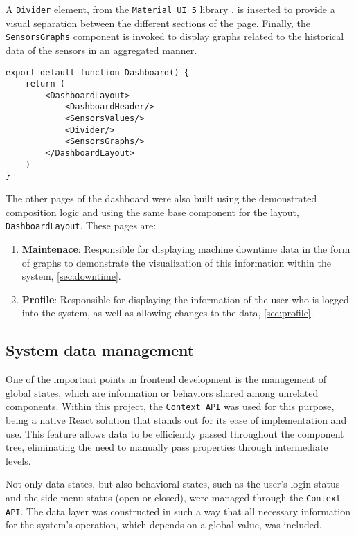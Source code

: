 A \texttt{Divider} element, from the \texttt{Material UI 5} library \cite{muiDocs}, is inserted to provide a visual separation between the different sections of the page. Finally, the \texttt{SensorsGraphs} component is invoked to display graphs related to the historical data of the sensors in an aggregated manner.

\begin{verbatim}
export default function Dashboard() {
    return (
        <DashboardLayout>
            <DashboardHeader/>
            <SensorsValues/>
            <Divider/>
            <SensorsGraphs/>
        </DashboardLayout>
    )
}
\end{verbatim}

The other pages of the dashboard were also built using the demonstrated composition logic and using the same base component for the layout, \texttt{DashboardLayout}. These pages are:
\begin{enumerate}
    \item \textbf{Maintenace}: Responsible for displaying machine downtime data in the form of graphs to demonstrate the visualization of this information within the system, \ref{sec:downtime}.
    \item \textbf{Profile}: Responsible for displaying the information of the user who is logged into the system, as well as allowing changes to the data, \ref{sec:profile}.
\end{enumerate}


\subsection{System data management}\label{subsec:contextApi}
One of the important points in frontend development is the management of global states, which are information or behaviors shared among unrelated components. Within this project, the \texttt{Context API} \cite{reactCreateContext} was used for this purpose, being a native React solution that stands out for its ease of implementation and use. This feature allows data to be efficiently passed throughout the component tree, eliminating the need to manually pass properties through intermediate levels.

Not only data states, but also behavioral states, such as the user's login status and the side menu status (open or closed), were managed through the \texttt{Context API}. The data layer was constructed in such a way that all necessary information for the system's operation, which depends on a global value, was included.

